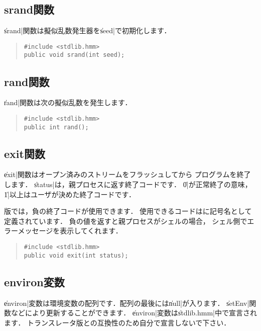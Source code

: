 \subsection{srand関数}

\|srand|関数は擬似乱数発生器を\|seed|で初期化します．

\begin{quote}
\begin{verbatim}
#include <stdlib.hmm>
public void srand(int seed);
\end{verbatim}
\end{quote}

\subsection{rand関数}

\|rand|関数は次の擬似乱数を発生します．

\begin{quote}
\begin{verbatim}
#include <stdlib.hmm>
public int rand();
\end{verbatim}
\end{quote}

\subsection{exit関数}

\|exit|関数はオープン済みのストリームをフラッシュしてから
プログラムを終了します．
\|status|は，親プロセスに返す終了コードです．
\|0|が正常終了の意味，\|1|以上はユーザが決めた終了コードです．

{\tacos}版では，負の終了コードが使用できます．
使用できるコードはに記号名として定義されています．
負の値を返すと親プロセスがシェルの場合，
シェル側でエラーメッセージを表示してくれます．

\begin{quote}
\begin{verbatim}
#include <stdlib.hmm>
public void exit(int status);
\end{verbatim}
\end{quote}

\subsection{environ変数}

\|environ|変数は環境変数の配列です．配列の最後には\|null|が入ります．
\|setEnv|関数などにより更新することができます．
\|environ|変数は\|stdlib.hmm|中で宣言されます．
トランスレータ版との互換性のため自分で宣言しないで下さい．

